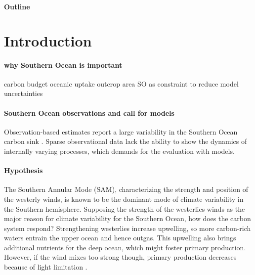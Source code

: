 \documentclass[12pt]{article}
\begin{document}
 


\baselineskip24pt


\Huge
\textbf{Outline}

\normalsize
\tableofcontents

\newpage

\section{Introduction}

\paragraph{why Southern Ocean is important} carbon budget oceanic uptake \citep{Sabine2004} \citep{Quere2016a} outcrop area \citep{Marshall2012} SO as constraint to reduce model uncertainties \citep{Kessler2016}

\paragraph{Southern Ocean observations and call for models}
Observation-based estimates report a large variability in the Southern Ocean carbon sink \citep{LeQuere2007,landschuetzer2015}. Sparse observational data lack the ability to show the dynamics of internally varying processes, which demands for the evaluation with models.
 
\paragraph{Hypothesis}
The Southern Annular Mode (SAM), characterizing the strength and position of the westerly winds, is known to be the dominant mode of climate variability in the Southern hemisphere. Supposing the strength of the westerlies winds as the major reason for climate variability for the Southern Ocean, how does the carbon system respond? Strengthening westerlies increase upwelling, so more carbon-rich waters entrain the upper ocean and hence outgas. This upwelling also brings additional nutrients for the deep ocean, which might foster primary production. However, if the wind mixes too strong though, primary production decreases because of light limitation \citep{Sverdrup1953}.
\end{document}
